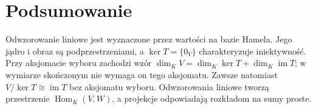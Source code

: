 \section{Podsumowanie}
\label{sec:lin3-podsumowanie}

Odwzorowanie liniowe jest wyznaczone przez
wartości na bazie Hamela. Jego jądro i obraz
są podprzestrzeniami, a \(\ker T=\{0_V\}\)
charakteryzuje iniektywność. Przy aksjomacie
wyboru zachodzi wzór
\(\dim_KV=\dim_K\ker T+\dim_K\operatorname{im}T\);
w wymiarze skończonym nie wymaga on tego aksjomatu.
Zawsze natomiast \(V/\ker T\cong\operatorname{im}T\)
bez aksjomatu wyboru. Odwzorowania liniowe
tworzą przestrzenie \(\operatorname{Hom}_K(V,W)\),
a projekcje odpowiadają rozkładom na sumy proste.

